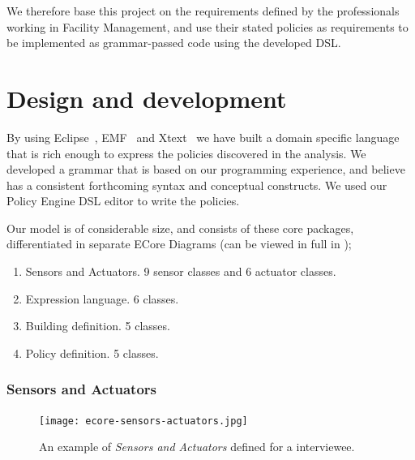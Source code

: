\documentclass{llncs}
\begin{document}
We therefore base this project on the requirements defined by the professionals working in Facility Management, and use their stated policies as requirements to be implemented as grammar-passed code using the developed DSL.

\section{Design and development}\label{sec:dsldesign}
By using Eclipse~\cite{eclipse}, EMF~\cite{emf} and Xtext~\cite{xtext} we have built a domain specific language that is rich enough to express the policies discovered in the analysis. We developed a grammar that is based on our programming experience, and believe has a consistent forthcoming syntax and conceptual constructs. We used our Policy Engine DSL editor to write the policies.

Our model is of considerable size, and consists of these core packages, differentiated in separate ECore Diagrams (can be viewed in full in );

\begin{enumerate}
	\item Sensors and Actuators. 9 sensor classes and 6 actuator classes.
	\item Expression language. 6 classes.
	\item Building definition. 5 classes.
	\item Policy definition. 5 classes.
\end{enumerate}

\subsubsection{Sensors and Actuators}
\begin{figure}
	\begin{center}
    \texttt{[image: ecore-sensors-actuators.jpg]} 
     \end{center}  
	\caption{An example of \textit{Sensors and Actuators} defined for a interviewee.}
\label{fig:ecore-sensors-actuators}
\end{figure}
\end{document}
